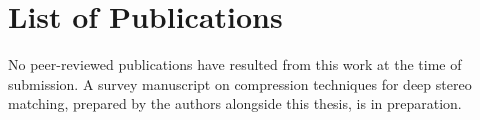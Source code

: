 \chapter{List of Publications}

No peer-reviewed publications have resulted from this work at the time of
submission. A survey manuscript on compression techniques for deep stereo
matching, prepared by the authors alongside this thesis, is in
preparation.
